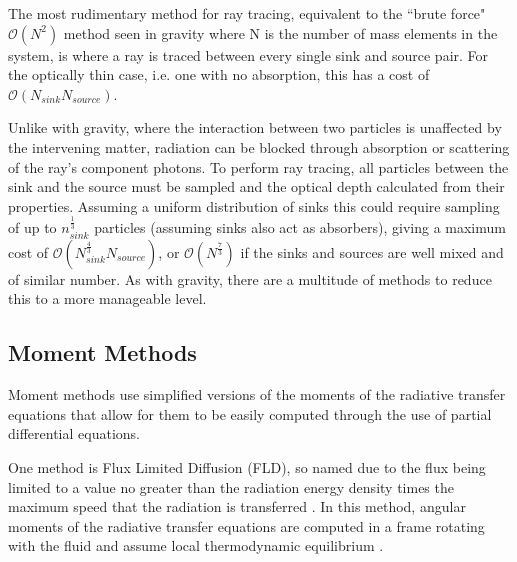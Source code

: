 The most rudimentary method for ray tracing, equivalent to the ``brute force" $\mathcal{O}(N^2)$ method seen in gravity where N is the number of mass elements in the system, is where a ray is traced between every single sink and source pair. For the optically thin case, i.e. one with no absorption, this has a cost of $\mathcal{O}(N_{sink} N_{source})$. 

Unlike with gravity, where the interaction between two particles is unaffected by the intervening matter, radiation can be blocked through absorption or scattering of the ray's component photons. To perform ray tracing, all particles between the sink and the source must be sampled and the optical depth calculated from their properties. Assuming a uniform distribution of sinks this could require sampling of up to $n_{sink}^{\frac{1}{3}}$ particles (assuming sinks also act as absorbers), giving a maximum cost of $\mathcal{O}(N_{sink}^{\frac{4}{3}} N_{source})$, or $\mathcal{O}(N^{\frac{7}{3}})$ if the sinks and sources are well mixed and of similar number. As with gravity, there are a multitude of methods to reduce this to a more manageable level.

\subsection{Moment Methods}
Moment methods use simplified versions of the moments of the radiative transfer equations that allow for them to be easily computed through the use of partial differential equations. 

One method is Flux Limited Diffusion (FLD), so named due to the flux being limited to a value no greater than the radiation energy density times the maximum speed that the radiation is transferred \citep{FLD}. In this method, angular moments of the radiative transfer equations are computed in a frame rotating with the fluid and assume local thermodynamic equilibrium \citep{M&M1984}. 

